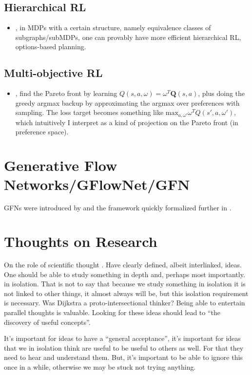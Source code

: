 \subsection{Hierarchical RL}
\begin{itemize}
  \item \citet{wen2020efficiency}, in MDPs with a certain structure, namely equivalence classes of subgraphs/subMDPs, one can provably have more efficient hierarchical RL, options-based planning.
\end{itemize}
    
\subsection{Multi-objective RL}
\begin{itemize}
  \item \citet{yang2019generalized}, find the Pareto front by learning $Q(s,a,\omega)=\omega^T\mathbf{Q}(s,a)$, plus doing the greedy argmax backup by approximating the argmax over preferences with sampling. The loss target becomes something like $\mbox{max}_{a,\omega'}\omega^TQ(s',a,\omega')$, which intuitively I interpret as a kind of projection on the Pareto front (in preference space).
\end{itemize}

\section{Generative Flow Networks/GFlowNet/GFN}
GFNs were introduced by \citet{bengio2021flow} and the framework quickly formalized further in \citet{bengio2021gflownet}.

\section{Thoughts on Research}

On the role of scientific thought \cite{dijkstra1974role}. Have clearly defined, albeit interlinked, ideas. One should be able to study something in depth and, perhaps most importantly. in isolation. That is not to say that because we study something in isolation it is not linked to other things, it almost always will be, but this isolation requirement is necessary. Was Dijkstra a proto-intersectional thinker? Being able to entertain parallel thoughts is valuable. Looking for these ideas should lead to ``the discovery of useful concepts''.

It's important for ideas to have a ``general acceptance'', it's important for ideas that we in isolation think are useful to be useful to others as well. For that they need to hear and understand them. But, it's important to be able to ignore this once in a while, otherwise we may be stuck not trying anything.

